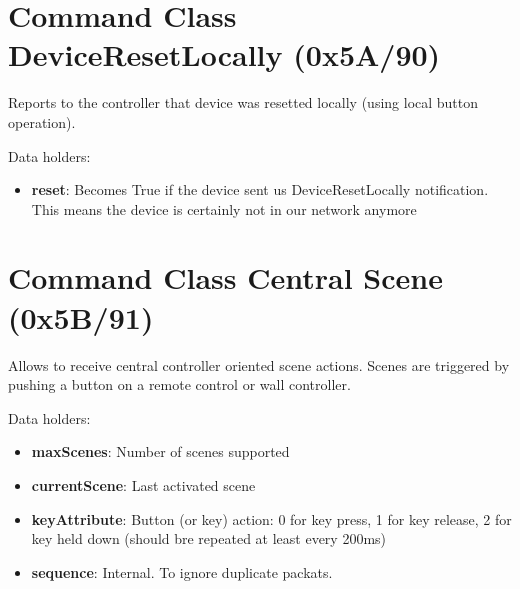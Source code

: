 \section{Command Class DeviceResetLocally (0x5A/90)}

Reports to the controller that device was resetted locally (using local button operation).
\newline

\noindent
Data holders:

\begin{itemize}
\item \textbf{reset}: Becomes True if the device sent us DeviceResetLocally notification. This means the device is certainly not in our network anymore
\end{itemize}


\section{Command Class Central Scene (0x5B/91)}

Allows to receive central controller oriented scene actions. Scenes are triggered by pushing a button on a remote control or wall controller.
\newline

\noindent
Data holders:

\begin{itemize}
\item \textbf{maxScenes}: Number of scenes supported
\item \textbf{currentScene}: Last activated scene
\item \textbf{keyAttribute}: Button (or key) action: 0 for key press, 1 for key release, 2 for key held down (should bre repeated at least every 200ms)
\item \textbf{sequence}: Internal. To ignore duplicate packats.
\end{itemize}
